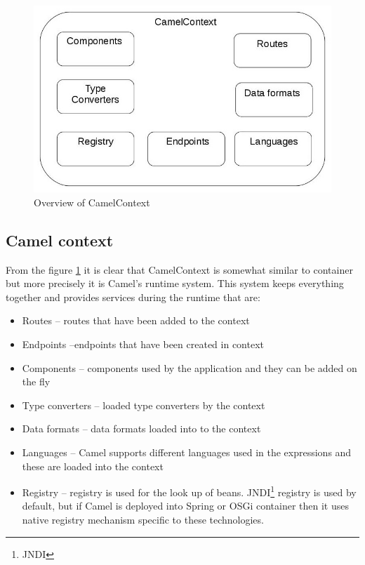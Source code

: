 \documentclass[12pt,final,oneside]{fithesis2}
\begin{document}
\begin{figure}[!h]
\centering
\includegraphics[width=0.9\linewidth]{sources/CamelContextCrop.jpg}
\caption{Overview of CamelContext}
\label{camelContext}
\end{figure}

\subsection*{Camel context}
From the figure \ref{camelContext} it is clear that CamelContext is somewhat similar to container but more precisely it is Camel's runtime system. This system keeps everything together and provides services during the runtime that are:
\begin{itemize}
\item
Routes -- routes that have been added to the context

\item
Endpoints --endpoints that have been created in context

\item
Components -- components used by the application and they can be added on the fly

\item
Type converters -- loaded type converters by the context

\item
Data formats -- data formats loaded into to the context

\item
Languages -- Camel supports different languages used in the expressions and these are loaded into the context

\item
Registry -- registry is used for the look up of beans. JNDI\footnote{JNDI} registry is used by default, but if Camel is deployed into Spring or OSGi container then it uses native registry mechanism specific to these technologies.

\end{itemize}
\end{document}
